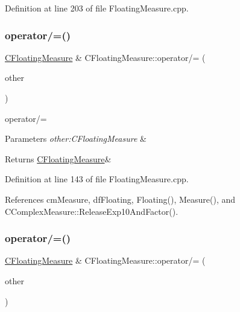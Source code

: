 Definition at line 203 of file Floating\+Measure.\+cpp.

\mbox{\label{classCFloatingMeasure_a1bc972be1fa5abd0619849710eef398c}} 
\subsubsection{\texorpdfstring{operator/=()}{operator/=()}\hspace{0.1cm}{\footnotesize\ttfamily [1/2]}}
{\footnotesize\ttfamily \hyperlink{classCFloatingMeasure}{C\+Floating\+Measure} \& C\+Floating\+Measure\+::operator/= (\begin{DoxyParamCaption}\item[{const \hyperlink{classCFloatingMeasure}{C\+Floating\+Measure} \&}]{other }\end{DoxyParamCaption})}



operator/= 


\begin{DoxyParams}{Parameters}
{\em other\+:\+C\+Floating\+Measure} & \\
\hline
\end{DoxyParams}
\begin{DoxyReturn}{Returns}
\hyperlink{classCFloatingMeasure}{C\+Floating\+Measure}\& 
\end{DoxyReturn}


Definition at line 143 of file Floating\+Measure.\+cpp.



References cm\+Measure, df\+Floating, Floating(), Measure(), and C\+Complex\+Measure\+::\+Release\+Exp10\+And\+Factor().

\mbox{\label{classCFloatingMeasure_a2ba332fa822922d51866e4361db1677b}} 
\subsubsection{\texorpdfstring{operator/=()}{operator/=()}\hspace{0.1cm}{\footnotesize\ttfamily [2/2]}}
{\footnotesize\ttfamily \hyperlink{classCFloatingMeasure}{C\+Floating\+Measure} \& C\+Floating\+Measure\+::operator/= (\begin{DoxyParamCaption}\item[{const double \&}]{other }\end{DoxyParamCaption})}



